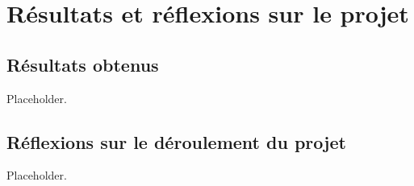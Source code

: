 \section{Résultats et réflexions sur le projet}

\subsection{Résultats obtenus}

Placeholder.

\subsection{Réflexions sur le déroulement du projet}

Placeholder.